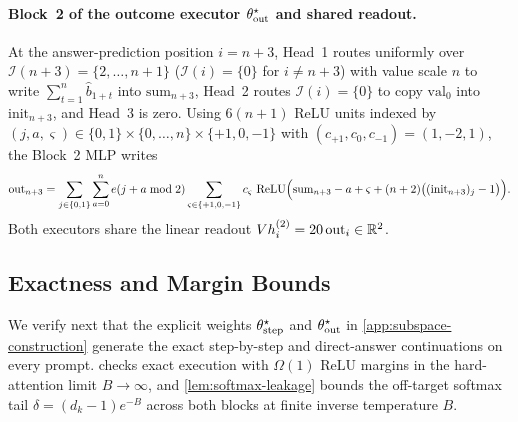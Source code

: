 \paragraph{Block~2 of the outcome executor $\theta^\star_{\mathrm{out}}$ and shared readout.}
At the answer-prediction position $i = n+3$, Head~1 routes uniformly over $\mathcal I(n+3) = \{2,\ldots,n+1\}$ ($\mathcal I(i)=\{0\}$ for $i \ne n+3$) with value scale $n$ to write $\sum_{t=1}^n \hat b_{1+t}$ into $\mathrm{sum}_{n+3}$, Head~2 routes $\mathcal I(i) = \{0\}$ to copy $\mathrm{val}_0$ into $\mathrm{init}_{n+3}$, and Head~3 is zero. Using $6(n+1)$ ReLU units indexed by $(j, a, \varsigma) \in \{0,1\}\times\{0,\ldots,n\}\times\{+1,0,-1\}$ with $(c_{+1}, c_0, c_{-1}) = (1, -2, 1)$, the Block~2 MLP writes
\[
 \mathrm{out}_{n+3} = \sum_{j\in\{0,1\}}\sum_{a=0}^n e(j+a\bmod 2)\sum_{\varsigma\in\{+1,0,-1\}} c_\varsigma\,\operatorname{ReLU}\Bigl(\mathrm{sum}_{n+3} - a + \varsigma + (n+2)\bigl((\mathrm{init}_{n+3})_j - 1\bigr)\Bigr).
\]
Both executors share the linear readout $V h_i^{(2)} = 20\,\mathrm{out}_i \in \mathbb R^2$.

\subsection{Exactness and Margin Bounds}
\label{app:exact}
\label{tab:leakage-bounds}

We verify next that the explicit weights $\theta^\star_{\mathrm{step}}$ and $\theta^\star_{\mathrm{out}}$ in \cref{app:subspace-construction} generate the exact step-by-step and direct-answer continuations on every prompt.  checks exact execution with $\Omega(1)$ ReLU margins in the hard-attention limit $B \to \infty$, and \cref{lem:softmax-leakage} bounds the off-target softmax tail $\delta = (d_k - 1)e^{-B}$ across both blocks at finite inverse temperature $B$.

